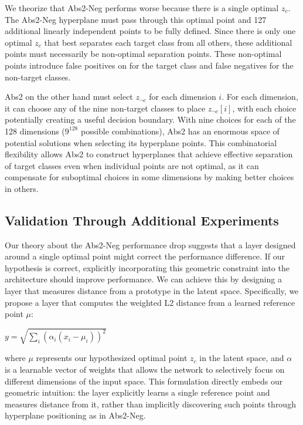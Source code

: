We theorize that Abs2-Neg performs worse because there is a single optimal $z_c$. The Abs2-Neg hyperplane must pass through this optimal point and 127 additional linearly independent points to be fully defined. Since there is only one optimal $z_c$ that best separates each target class from all others, these additional points must necessarily be non-optimal separation points. These non-optimal points introduce false positives on for the target class and false negatives for the non-target classes. 

Abs2 on the other hand must select $z_{\neg c}$ for each dimension $i$. For each dimension, it can choose any of the nine non-target classes to place $z_{\neg c}[i]$, with each choice potentially creating a useful decision boundary. With nine choices for each of the 128 dimensions ($9^{128}$ possible combinations), Abs2 has an enormous space of potential solutions when selecting its hyperplane points. This combinatorial flexibility allows Abs2 to construct hyperplanes that achieve effective separation of target classes even when individual points are not optimal, as it can compensate for suboptimal choices in some dimensions by making better choices in others.

\subsection{Validation Through Additional Experiments}

Our theory about the Abs2-Neg performance drop suggests that a layer designed around a single optimal point might correct the performance difference. If our hypothesis is correct, explicitly incorporating this geometric constraint into the architecture should improve performance. We can achieve this by designing a layer that measures distance from a prototype in the latent space. Specifically, we propose a layer that computes the weighted L2 distance from a learned reference point $\mu$:

$y = \sqrt{\sum_i (\alpha_i(x_i - \mu_i))^2}$

where $\mu$ represents our hypothesized optimal point $z_c$ in the latent space, and $\alpha$ is a learnable vector of weights that allows the network to selectively focus on different dimensions of the input space. This formulation directly embeds our geometric intuition: the layer explicitly learns a single reference point and measures distance from it, rather than implicitly discovering such points through hyperplane positioning as in Abs2-Neg.


